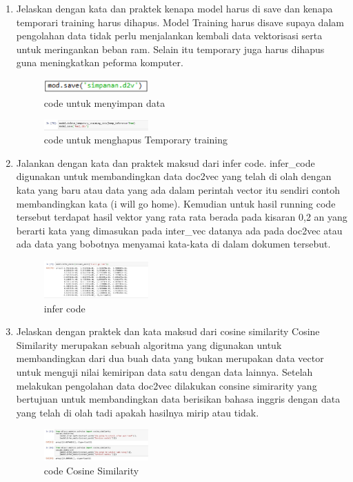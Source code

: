 \begin{enumerate}
    \item Jelaskan dengan kata dan praktek kenapa model harus di save dan kenapa temporari training harus dihapus.
    Model Training harus disave supaya dalam pengolahan data tidak perlu menjalankan kembali data vektorisasi serta untuk meringankan beban ram. Selain itu temporary juga  harus dihapus guna meningkatkan peforma komputer.
    \begin{figure}[H]
        \includegraphics[width=4cm]{figures/1174096/tugas5/praktek6_1.PNG}
        \centering
        \caption{code untuk menyimpan data}
    \end{figure}
    \begin{figure}[H]
        \includegraphics[width=4cm]{figures/1174096/tugas5/praktek6_2.JPG}
        \centering
        \caption{code untuk menghapus Temporary training}
    \end{figure}

    \item Jalankan dengan kata dan praktek maksud dari infer code.
    infer\_code digunakan untuk membandingkan data doc2vec yang telah di olah dengan kata yang baru atau data yang ada dalam perintah vector itu sendiri contoh membandingkan kata (i will go home). Kemudian untuk hasil running code tersebut terdapat hasil vektor yang rata rata berada pada kisaran 0,2 an yang berarti kata yang dimasukan pada inter\_vec datanya ada pada doc2vec atau ada data yang bobotnya menyamai kata-kata di dalam dokumen tersebut.
    \begin{figure}[H]
        \includegraphics[width=4cm]{figures/1174096/tugas5/praktek7.JPG}
        \centering
        \caption{infer code}
    \end{figure}

    \item Jelaskan dengan praktek dan kata maksud dari cosine similarity
    Cosine Similarity merupakan sebuah algoritma yang digunakan untuk membandingkan dari dua buah data yang bukan merupakan data vector untuk menguji nilai kemiripan data satu dengan data lainnya. Setelah melakukan pengolahan data doc2vec dilakukan consine simirarity yang bertujuan untuk membandingkan data berisikan bahasa inggris dengan data yang telah di olah tadi apakah hasilnya mirip atau tidak.
    \begin{figure}[H]
        \includegraphics[width=4cm]{figures/1174096/tugas5/praktek8.JPG}
        \centering
        \caption{code Cosine Similarity}
    \end{figure}


\end{enumerate}
